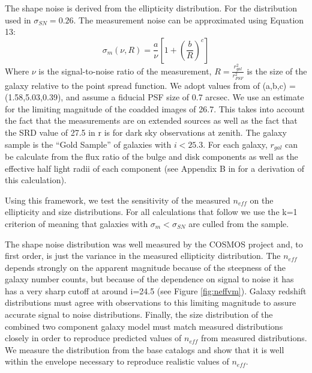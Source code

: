 \documentclass[]{article}
\begin{document}
{The shape noise is derived from the ellipticity distribution.  For the distribution used in \citet{chang} $\sigma_{SN} = 0.26$.
The measurement noise can be approximated using Equation 13:
\begin{equation}
\sigma_m(\nu,R) = \frac{a}{\nu}\left[1+\left(\frac{b}{R}\right)^c\right]
\end{equation}
Where $\nu$ is the signal-to-noise ratio of the measurement, $R=\frac{r_{gal}^2}{r_{PSF}^2}$ is the size of the galaxy relative to
the point spread function.  We adopt values from \citet{chang} of (a,b,c) = (1.58,5.03,0.39), and assume a fiducial
PSF size of 0.7 arcsec. We use an estimate for the limiting magnitude of the coadded images
of 26.7.  This takes into account the fact that the measurements are on extended sources as well as the fact that the SRD value 
of 27.5 in r is for dark sky observations at zenith.   The galaxy sample is the ``Gold Sample'' of galaxies with $i < 25.3$.
For each galaxy, $r_{gal}$ can be calculate from the flux ratio of the bulge and disk components as well as the effective half light 
radii of each component (see Appendix B in \citet{chang} for a derivation of this calculation).

Using this framework, we test the sensitivity of the measured $n_{eff}$ on the ellipticity and size distributions.  For all calculations that follow we 
use the k=1 criterion of \citet{chang} meaning that galaxies with $\sigma_m < \sigma_{SN}$ are culled from the sample.

The shape noise distribution was well measured by the COSMOS project \citep{cosmos} and, to first order, is just the variance in the measured 
ellipticity distribution.  The $n_{eff}$ depends strongly on the apparent magnitude because of the steepness of the galaxy number
counts, but because of the dependence on signal to noise it has
has a very sharp cutoff at around i=24.5 (see Figure \ref{fig:neffvm}).  Galaxy redshift distributions must
agree with observations to this limiting magnitude to assure accurate signal to noise distributions.  Finally, the size distribution
of the combined two component galaxy model must match measured distributions closely in order to reproduce predicted
values of $n_{eff}$ from measured distributions.  We measure the distribution from the base catalogs and show that it is well
within the envelope necessary to reproduce realistic values of $n_{eff}$.

}
\end{document}
